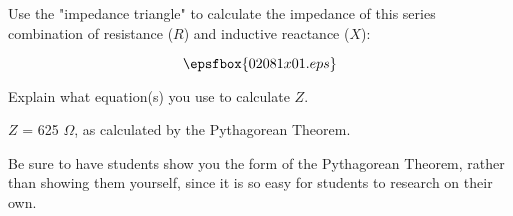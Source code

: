 

Use the "impedance triangle" to calculate the impedance of this series combination of resistance ($R$) and inductive reactance ($X$):

$$\epsfbox{02081x01.eps}$$

Explain what equation(s) you use to calculate $Z$.







$Z$ = 625 $\Omega$, as calculated by the Pythagorean Theorem.







Be sure to have students show you the form of the Pythagorean Theorem, rather than showing them yourself, since it is so easy for students to research on their own.




